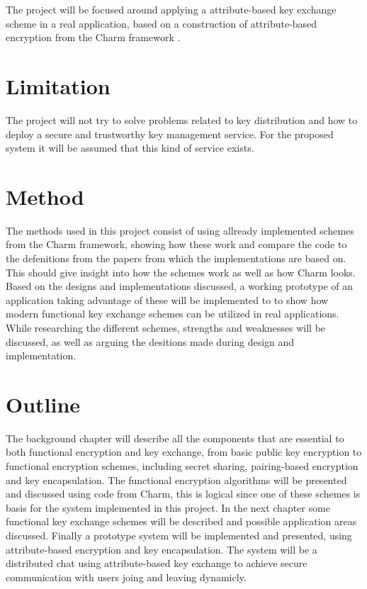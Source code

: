 The project will be focused around applying a attribute-based key exchange scheme in a real application, based on a construction of attribute-based encryption from the Charm framework \cite{DBLP:Charm13}.


\section{Limitation}\label{sec:limitations}
The project will not try to solve problems related to key distribution and how to deploy a secure and trustworthy key management service. For the proposed system it will be assumed that this kind of service exists.

\section{Method}
The methods used in this project consist of using allready implemented schemes from the Charm framework, showing how these work and compare the code to the defenitions from the papers from which the implementations are based on. This should give insight into how the schemes work as well as how Charm looks. Based on the designs and implementations discussed, a working prototype of an application taking advantage of these will be implemented to to show how modern functional key exchange schemes can be utilized in real applications. While researching the different schemes, strengths and weaknesses will be discussed, as well as arguing the desitions made during design and implementation.


\section{Outline}\label{sec:outline}
The background chapter will describe all the components that are essential to both functional encryption and key exchange, from basic public key encryption to functional encryption schemes, including secret sharing, pairing-based encryption and key encapsulation. The functional encryption algorithms will be presented and discussed using code from Charm, this is logical since one of these schemes is basis for the system implemented in this project. In the next chapter some functional key exchange schemes will be described and possible application areas discussed. Finally a prototype system will be implemented and presented, using attribute-based encryption and key encapsulation. The system will be a distributed chat using attribute-based key exchange to achieve secure communication with users joing and leaving dynamicly.
